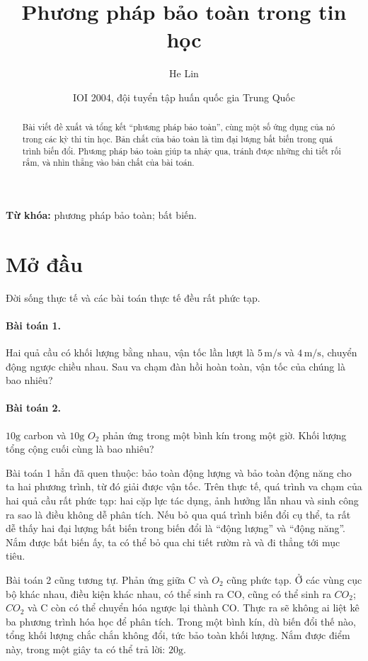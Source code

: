 \documentclass[11pt]{article}
\title{Phương pháp bảo toàn trong tin học}
\author{He Lin}
\date{IOI 2004, đội tuyển tập huấn quốc gia Trung Quốc}
\begin{document}
\maketitle


\begin{abstract}
Bài viết đề xuất và tổng kết ``phương pháp bảo toàn'', cùng một số ứng dụng
của nó trong các kỳ thi tin học. Bản chất của bảo toàn là tìm đại lượng bất
biến trong quá trình biến đổi. Phương pháp bảo toàn giúp ta nhảy qua, tránh
được những chi tiết rối rắm, và nhìn thẳng vào bản chất của bài toán.
\end{abstract}

\noindent\textbf{Từ khóa:} phương pháp bảo toàn; bất biến.

\section{Mở đầu}

Đời sống thực tế và các bài toán thực tế đều rất phức tạp.

\paragraph{Bài toán 1.}
Hai quả cầu có khối lượng bằng nhau, vận tốc lần lượt là \(5\,\mathrm{m/s}\)
và \(4\,\mathrm{m/s}\), chuyển động ngược chiều nhau. Sau va chạm đàn hồi hoàn
toàn, vận tốc của chúng là bao nhiêu?

\paragraph{Bài toán 2.}
\(10\mathrm{g}\) carbon và \(10\mathrm{g}\) \(O_2\) phản ứng trong một bình kín
trong một giờ. Khối lượng tổng cộng cuối cùng là bao nhiêu?

Bài toán 1 hẳn đã quen thuộc: bảo toàn động lượng và bảo toàn động năng cho ta
hai phương trình, từ đó giải được vận tốc. Trên thực tế, quá trình va chạm của
hai quả cầu rất phức tạp: hai cặp lực tác dụng, ảnh hưởng lẫn nhau và sinh
công ra sao là điều không dễ phân tích. Nếu bỏ qua quá trình biến đổi cụ thể,
ta rất dễ thấy hai đại lượng bất biến trong biến đổi là ``động lượng'' và
``động năng''. Nắm được bất biến ấy, ta có thể bỏ qua chi tiết rườm rà và đi
thẳng tới mục tiêu.

Bài toán 2 cũng tương tự. Phản ứng giữa C và \(O_2\) cũng phức tạp. Ở các vùng
cục bộ khác nhau, điều kiện khác nhau, có thể sinh ra CO, cũng có thể sinh ra
\(CO_2\); \(CO_2\) và C còn có thể chuyển hóa ngược lại thành CO. Thực ra sẽ
không ai liệt kê ba phương trình hóa học để phân tích. Trong một bình kín, dù
biến đổi thế nào, tổng khối lượng chắc chắn không đổi, tức bảo toàn khối
lượng. Nắm được điểm này, trong một giây ta có thể trả lời: \(20\mathrm{g}\).
\end{document}
